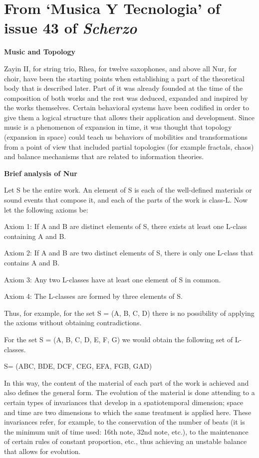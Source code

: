 \section{From `Musica Y Tecnologia' of issue 43 of \textit{Scherzo}}

\textbf{Music and Topology}

Zayin II, for string trio, Rhea, for twelve saxophones, and above all Nur, for choir, have been the starting points when establishing a part of the theoretical body that is described later. Part of it was already founded at the time of the composition of both works and the rest was deduced, expanded and inspired by the works themselves. Certain behavioral systems have been codified in order to give them a logical structure that allows their application and development. Since music is a phenomenon of expansion in time, it was thought that topology (expansion in space) could teach us behaviors of mobilities and transformations from a point of view that included partial topologies (for example fractals, chaos) and balance mechanisms that are related to information theories.

\textbf{Brief analysis of Nur}

Let S be the entire work. An element of S is each of the well-defined materials or sound events that compose it, and each of the parts of the work is class-L. Now let the following axioms be:

Axiom 1: If A and B are distinct elements of S, there exists at least one L-class containing A and B.

Axiom 2: If A and B are two distinct elements of S, there is only one L-class that contains A and B.

Axiom 3: Any two L-classes have at least one element of S in common.

Axiom 4: The L-classes are formed by three elements of S.

Thus, for example, for the set S = (A, B, C, D) there is no possibility of applying the axioms without obtaining contradictions.

For the set S = (A, B, C, D, E, F, G) we would obtain the following set of L-classes.

S= (ABC, BDE, DCF, CEG, EFA, FGB, GAD)

In this way, the content of the material of each part of the work is achieved and also defines the general form. The evolution of the material is done attending to a certain types of invariances that develop in a spatiotemporal dimension; space and time are two dimensions to which the same treatment is applied here. These invariances refer, for example, to the conservation of the number of beats (it is the minimum unit of time used: 16th note, 32nd note, etc.), to the maintenance of certain rules of constant proportion, etc., thus achieving an unstable balance that allows for evolution.

